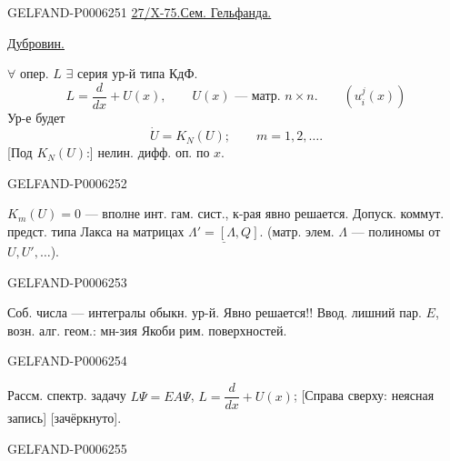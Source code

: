 \begin{GelfandAdjacentEvidence}{GELFAND-P000625}{1}
\underline{27/X-75.}\qquad\underline{Сем. Гельфанда.}

\underline{Дубровин.}

\(\forall\) опер. \(L\) \(\exists\) серия ур-й типа КдФ.
\begin{equation*}
L=\frac{d}{dx}+U(x),\qquad U(x)\text{ --- матр. }n\times n.\qquad (u_i^j(x))\tag{1}
\end{equation*}
Ур-е будет
\begin{equation*}
\dot U=K_N(U);\qquad m=1,2,\ldots .\tag{2}
\end{equation*}
[Под \(K_N(U)\):] нелин. дифф. оп. по \(x\).
\end{GelfandAdjacentEvidence}
\begin{GelfandAdjacentEvidence}{GELFAND-P000625}{2}


\underline{\(K_m(U)=0\)} --- вполне инт. гам. сист., к-рая явно решается.
Допуск. коммут. предст. типа Лакса на матрицах \(\underline{\Lambda'=[\Lambda,Q]}\).
(матр. элем. \(\Lambda\) --- полиномы от \(U,U',\ldots\)).
\end{GelfandAdjacentEvidence}
\begin{GelfandAdjacentEvidence}{GELFAND-P000625}{3}


Соб. числа --- интегралы обыкн. ур-й.
Явно решается!! Ввод. лишний пар. \(E\), возн. алг. геом.:
мн-зия Якоби рим. поверхностей.
\end{GelfandAdjacentEvidence}
\begin{GelfandAdjacentEvidence}{GELFAND-P000625}{4}


Рассм. спектр. задачу \(L\Psi=EA\Psi\), \(L=\dfrac{d}{dx}+U(x)\);
[Справа сверху: неясная запись] [зачёркнуто].
\end{GelfandAdjacentEvidence}
\begin{GelfandAdjacentEvidence}{GELFAND-P000625}{5}

\end{GelfandAdjacentEvidence}
